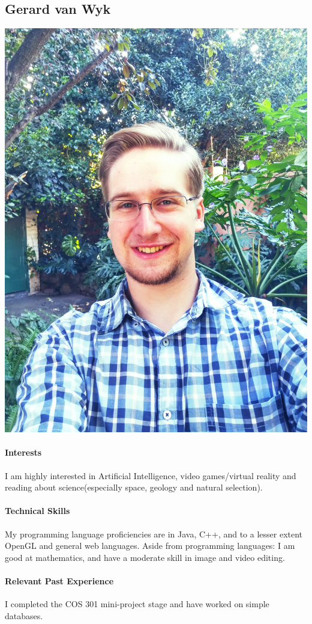 \documentclass[12pt]{article}
\begin{document}
\subsection{Gerard van Wyk}
\includegraphics[scale=0.04]{Gerard}
\paragraph{Interests}
I am highly interested in Artificial Intelligence, video games/virtual reality and reading about science(especially space, geology and natural selection).
\paragraph{Technical Skills}
My programming language proficiencies are in Java, C++, and to a lesser extent OpenGL and general web languages.
Aside from programming languages: I am good at mathematics, and have a moderate skill in image and video editing.
\paragraph{Relevant Past Experience}
I completed the COS 301 mini-project stage and have worked on simple databases.
\end{document}
